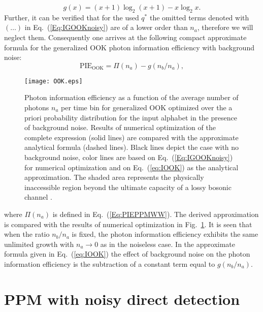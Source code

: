 \documentclass[conference]{IEEEtran}
\newcommand{\optval}[1]{#1^\ast}
\newcommand{\ookpulseprob}{q}
\begin{document}
\begin{equation}
g(x) = (x+1) \log_2 (x+1) - x\log_2 x.
\label{Eq:g(x)def}
\end{equation}
Further, it can be verified that for the used $\optval{\ookpulseprob}$ the omitted terms denoted with $(\ldots)$ in Eq.~(\ref{Eq:IGOOKnoisy}) are of a lower order than $n_a$, therefore we will neglect them. Consequently one arrives at the following compact approximate formula for the generalized OOK photon information efficiency with background noise:
\begin{equation}\label{eq:IOOK}
{\text{PIE}}_{\text{OOK}} =  {\Pi} (n_{a}) -  g(n_b/n_{a}),
\end{equation}
\begin{figure}[t!]
\texttt{[image: OOK.eps]}
\caption{Photon information efficiency as a function of the average number of photons $n_a$ per time bin for generalized OOK optimized over the a priori probability distribution for the input alphabet in the presence of background noise. Results of numerical optimization of the complete expression (solid lines) are compared with the approximate analytical formula (dashed lines). Black lines depict the case with no background noise, color lines are based on Eq.~(\ref{Eq:IGOOKnoisy}) for numerical optimization and on Eq.~(\ref{eq:IOOK}) as the analytical approximation. The shaded area represents the physically inaccessible region beyond the ultimate capacity of a lossy bosonic channel \cite{Giovannetti2004}.}
\label{fig:OOK}
\end{figure}
where ${\Pi} (n_{a})$ is defined in Eq.~(\ref{Eq:PIEPPMWW}).
The derived approximation is compared with the results of numerical optimization in Fig.~\ref{fig:OOK}. It is seen that when the ratio
$n_b/n_a$ is fixed, the photon information efficiency exhibits the same unlimited growth with $n_a \rightarrow 0$ as in the noiseless case. In the approximate formula given in Eq.~(\ref{eq:IOOK}) the effect of background noise on the photon information efficiency is the subtraction of a constant term equal to $g(n_b/n_{a})$.




\section{PPM with noisy direct detection}
\label{Sec:NoisyPPM}
\end{document}

